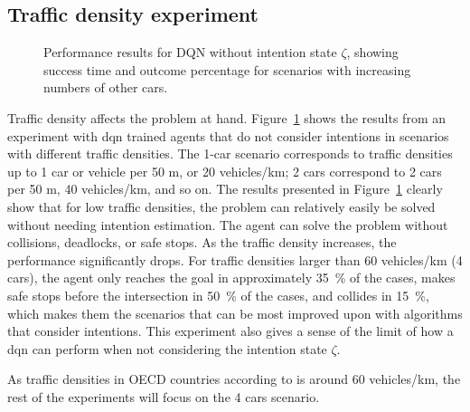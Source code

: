 \subsection{Traffic density experiment}
\begin{figure}[!h]
    \centering
        
        \vspace{-0.8cm}
        \caption{Performance results for DQN without intention state $\zeta$, showing success time and outcome percentage for scenarios with increasing numbers of other cars.}
    \label{fig:number_cars}
\end{figure}
Traffic density affects the problem at hand. Figure~\ref{fig:number_cars} shows the results from an experiment with \gls{dqn} trained agents that do not consider intentions in scenarios with different traffic densities. The 1-car scenario corresponds to traffic densities up to 1 car or vehicle per 50 m, or 20 vehicles/km; 2 cars correspond to 2 cars per 50 m, 40 vehicles/km, and so on. The results presented in Figure~\ref{fig:number_cars} clearly show that for low traffic densities, the problem can relatively easily be solved without needing intention estimation. The agent can solve the problem without collisions, deadlocks, or safe stops. As the traffic density increases, the performance significantly drops. For traffic densities larger than 60 vehicles/km (4 cars), the agent only reaches the goal in approximately \SI{35}{\percent} of the cases, makes safe stops before the intersection in \SI{50}{\percent} of the cases, and collides in \SI{15}{\percent}, which makes them the scenarios that can be most improved upon with algorithms that consider intentions. This experiment also gives a sense of the limit of how a \gls{dqn} can perform when not considering the intention state $\zeta$.

As traffic densities in OECD countries according to \cite{OECD} is around 60 vehicles/km, the rest of the experiments will focus on the 4 cars scenario. 


